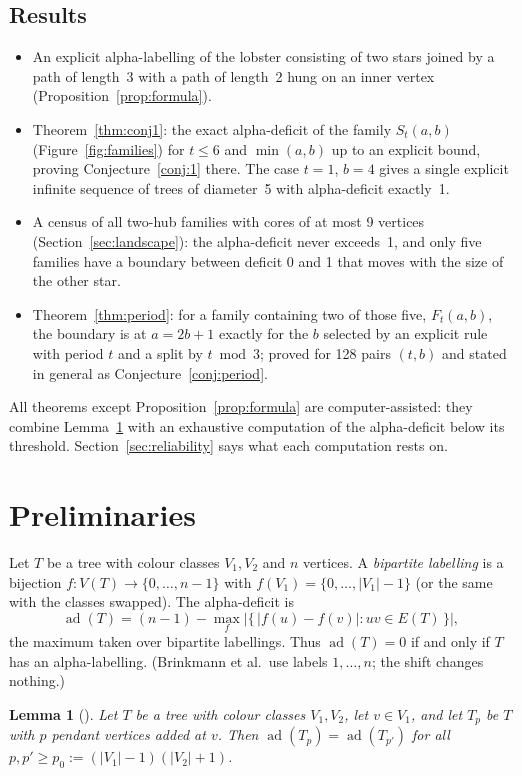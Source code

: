 \documentclass[11pt]{amsart}
\newtheorem{lemma}[theorem]{Lemma}
\theoremstyle{definition}
\newcommand{\ad}{\operatorname{ad}}
\begin{document}
\subsection*{Results}
\begin{itemize}
\item An explicit alpha-labelling of the lobster consisting of two stars joined by a path of length~3 with a
  path of length~2 hung on an inner vertex (Proposition~\ref{prop:formula}).
\item Theorem~\ref{thm:conj1}: the exact alpha-deficit of the family $S_t(a,b)$ (Figure~\ref{fig:families}) for
  $t\le 6$ and $\min(a,b)$ up to an explicit bound, proving Conjecture~\ref{conj:1} there. The case $t=1$, $b=4$
  gives a single explicit infinite sequence of trees of diameter~5 with alpha-deficit exactly~1.
\item A census of all two-hub families with cores of at most 9 vertices (Section~\ref{sec:landscape}): the
  alpha-deficit never exceeds~1, and only five families have a boundary between deficit 0 and 1 that moves with
  the size of the other star.
\item Theorem~\ref{thm:period}: for a family containing two of those five, $F_t(a,b)$, the boundary is at $a=2b+1$ exactly for
  the $b$ selected by an explicit rule with period $t$ and a split by $t \bmod 3$; proved for 128 pairs $(t,b)$
  and stated in general as Conjecture~\ref{conj:period}.
\end{itemize}
All theorems except Proposition~\ref{prop:formula} are computer-assisted: they combine Lemma~\ref{lem:51} with
an exhaustive computation of the alpha-deficit below its threshold. Section~\ref{sec:reliability} says what each
computation rests on.

\section{Preliminaries}\label{sec:prelim}

Let $T$ be a tree with colour classes $V_1,V_2$ and $n$ vertices. A \emph{bipartite labelling} is a bijection
$f\colon V(T)\to\{0,\dots,n-1\}$ with $f(V_1)=\{0,\dots,|V_1|-1\}$ (or the same with the classes swapped).
The alpha-deficit is
\[
\ad(T) = (n-1) - \max_f \bigl|\{\,|f(u)-f(v)| : uv\in E(T)\,\}\bigr|,
\]
the maximum taken over bipartite labellings. Thus $\ad(T)=0$ if and only if $T$ has an alpha-labelling.
(Brinkmann et al.\ use labels $1,\dots,n$; the shift changes nothing.)

\begin{lemma}[{\cite[Lemma~5.1]{bcmrs}}]\label{lem:51}
Let $T$ be a tree with colour classes $V_1,V_2$, let $v\in V_1$, and let $T_p$ be $T$ with $p$ pendant vertices
added at $v$. Then $\ad(T_p)=\ad(T_{p'})$ for all $p,p'\ge p_0:=(|V_1|-1)(|V_2|+1)$.
\end{lemma}
\end{document}
